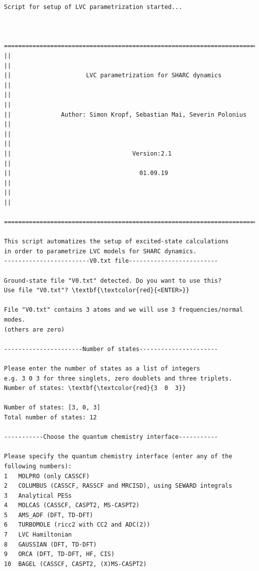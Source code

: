 \documentclass[a4paper,11pt,DIV=15,openany]{scrbook}
\begin{document}
\begin{oframed}
\footnotesize\begin{Verbatim}[commandchars=\\\{\}]
  Script for setup of LVC parametrization started...


  ================================================================================
||                                                                                ||
||                     LVC parametrization for SHARC dynamics                     ||
||                                                                                ||
||              Author: Simon Kropf, Sebastian Mai, Severin Polonius              ||
||                                                                                ||
||                                  Version:2.1                                   ||
||                                    01.09.19                                    ||
||                                                                                ||
  ================================================================================

This script automatizes the setup of excited-state calculations
in order to parametrize LVC models for SHARC dynamics.
------------------------V0.txt file-------------------------

Ground-state file "V0.txt" detected. Do you want to use this?
Use file "V0.txt"? \textbf{\textcolor{red}{<ENTER>}}

File "V0.txt" contains 3 atoms and we will use 3 frequencies/normal modes.
(others are zero)

----------------------Number of states----------------------

Please enter the number of states as a list of integers
e.g. 3 0 3 for three singlets, zero doublets and three triplets.
Number of states: \textbf{\textcolor{red}{3  0  3}}

Number of states: [3, 0, 3]
Total number of states: 12

-----------Choose the quantum chemistry interface-----------

Please specify the quantum chemistry interface (enter any of the following numbers):
1	MOLPRO (only CASSCF)
2	COLUMBUS (CASSCF, RASSCF and MRCISD), using SEWARD integrals
3	Analytical PESs
4	MOLCAS (CASSCF, CASPT2, MS-CASPT2)
5	AMS_ADF (DFT, TD-DFT)
6	TURBOMOLE (ricc2 with CC2 and ADC(2))
7	LVC Hamiltonian
8	GAUSSIAN (DFT, TD-DFT)
9	ORCA (DFT, TD-DFT, HF, CIS)
10	BAGEL (CASSCF, CASPT2, (X)MS-CASPT2)


\end{Verbatim}
\end{oframed}
\end{document}
